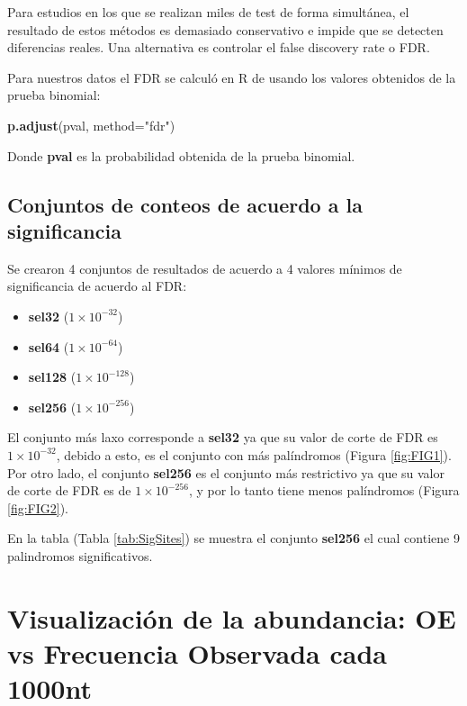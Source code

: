 \documentclass[
]{book}
\newenvironment{Shaded}{\begin{snugshade}}{\end{snugshade}}
\newcommand{\AttributeTok}[1]{\textcolor[rgb]{0.13,0.29,0.53}{#1}}
\newcommand{\FunctionTok}[1]{\textcolor[rgb]{0.13,0.29,0.53}{\textbf{#1}}}
\newcommand{\NormalTok}[1]{#1}
\newcommand{\StringTok}[1]{\textcolor[rgb]{0.31,0.60,0.02}{#1}}
\providecommand{\tightlist}{%
  \setlength{\itemsep}{0pt}\setlength{\parskip}{0pt}}
\begin{document}
Para estudios en los que se realizan miles de test de forma simultánea, el resultado de estos métodos es demasiado conservativo e impide que se detecten diferencias reales. Una alternativa es controlar el false discovery rate o FDR.

Para nuestros datos el FDR se calculó en R de usando los valores obtenidos de la prueba binomial:

\begin{Shaded}
\begin{Highlighting}[]
\FunctionTok{p.adjust}\NormalTok{(pval, }\AttributeTok{method=}\StringTok{"fdr"}\NormalTok{)}
\end{Highlighting}
\end{Shaded}

Donde \textbf{pval} es la probabilidad obtenida de la prueba binomial.

\hypertarget{conjuntos-de-conteos-de-acuerdo-a-la-significancia}{%
\subsection{Conjuntos de conteos de acuerdo a la significancia}\label{conjuntos-de-conteos-de-acuerdo-a-la-significancia}}

Se crearon 4 conjuntos de resultados de acuerdo a 4 valores mínimos de significancia de acuerdo al FDR:

\begin{itemize}
\tightlist
\item
  \textbf{sel32} (\(1 \times 10^{-32}\))
\item
  \textbf{sel64} (\(1 \times 10^{-64}\))
\item
  \textbf{sel128} (\(1 \times 10^{-128}\))
\item
  \textbf{sel256} (\(1 \times 10^{-256}\))
\end{itemize}

El conjunto más laxo corresponde a \textbf{sel32} ya que su valor de corte de FDR es \(1 \times 10^{-32}\), debido a esto, es el conjunto con más palíndromos (Figura \ref{fig:FIG1}). Por otro lado, el conjunto \textbf{sel256} es el conjunto más restrictivo ya que su valor de corte de FDR es de \(1 \times 10^{-256}\), y por lo tanto tiene menos palíndromos (Figura \ref{fig:FIG2}).

En la tabla (Tabla \ref{tab:SigSites}) se muestra el conjunto \textbf{sel256} el cual contiene 9 palindromos significativos.

\hypertarget{visualizaciuxf3n-de-la-abundancia-oe-vs-frecuencia-observada-cada-1000nt}{%
\section{Visualización de la abundancia: OE vs Frecuencia Observada cada 1000nt}\label{visualizaciuxf3n-de-la-abundancia-oe-vs-frecuencia-observada-cada-1000nt}}
\end{document}
